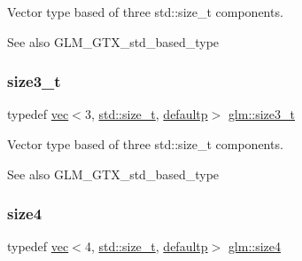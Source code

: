 Vector type based of three std\+::size\+\_\+t components. \begin{DoxySeeAlso}{See also}
G\+L\+M\+\_\+\+G\+T\+X\+\_\+std\+\_\+based\+\_\+type 
\end{DoxySeeAlso}
\mbox{\label{group__gtx__std__based__type_gaf0ec088c61853e4ed8155ef66b3760a2}} 
\subsubsection{\texorpdfstring{size3\+\_\+t}{size3\_t}}
{\footnotesize\ttfamily typedef \mbox{\hyperlink{structglm_1_1vec}{vec}}$<$3, \mbox{\hyperlink{_s_d_l__config__winrt_8h_a7c94ea6f8948649f8d181ae55911eeaf}{std\+::size\+\_\+t}}, \mbox{\hyperlink{namespaceglm_a36ed105b07c7746804d7fdc7cc90ff25a9d21ccd8b5a009ec7eb7677befc3bf51}{defaultp}}$>$ \mbox{\hyperlink{group__gtx__std__based__type_gaf0ec088c61853e4ed8155ef66b3760a2}{glm\+::size3\+\_\+t}}}

Vector type based of three std\+::size\+\_\+t components. \begin{DoxySeeAlso}{See also}
G\+L\+M\+\_\+\+G\+T\+X\+\_\+std\+\_\+based\+\_\+type 
\end{DoxySeeAlso}
\mbox{\label{group__gtx__std__based__type_ga6051b5077b52ff8ea48a5207d5076aa5}} 
\subsubsection{\texorpdfstring{size4}{size4}}
{\footnotesize\ttfamily typedef \mbox{\hyperlink{structglm_1_1vec}{vec}}$<$4, \mbox{\hyperlink{_s_d_l__config__winrt_8h_a7c94ea6f8948649f8d181ae55911eeaf}{std\+::size\+\_\+t}}, \mbox{\hyperlink{namespaceglm_a36ed105b07c7746804d7fdc7cc90ff25a9d21ccd8b5a009ec7eb7677befc3bf51}{defaultp}}$>$ \mbox{\hyperlink{group__gtx__std__based__type_ga6051b5077b52ff8ea48a5207d5076aa5}{glm\+::size4}}}

